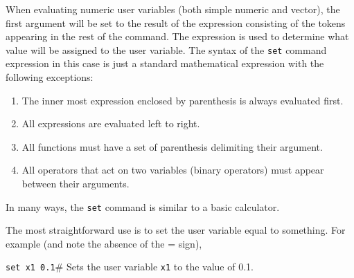 When evaluating numeric user variables (both simple numeric and vector),
the first argument will be set
to the result of the expression consisting of the tokens appearing in
the rest of the command.
The expression is used to
determine what value will be assigned to the user variable.
The syntax of the {\tt set} command expression in this case is just a standard
mathematical expression with the following exceptions:
\begin{enumerate}
  \item The inner most expression enclosed by parenthesis
        is always evaluated first.
\samepage
  \item All expressions are evaluated left to right.
  \item All functions must have a set of parenthesis delimiting their argument.
  \item All operators that act on two variables (binary operators)
        must appear between their arguments.
\end{enumerate}
In many ways, the {\tt set} command is similar to a basic calculator.

The most straightforward use is to set the user variable equal to
something.
For example (and note the absence of the = sign),
\begin{wiplist}%
  \item {\tt set x1 0.1}\hfill\# Sets the user variable
    {\tt x1} to the value of 0.1.
\end{wiplist}

